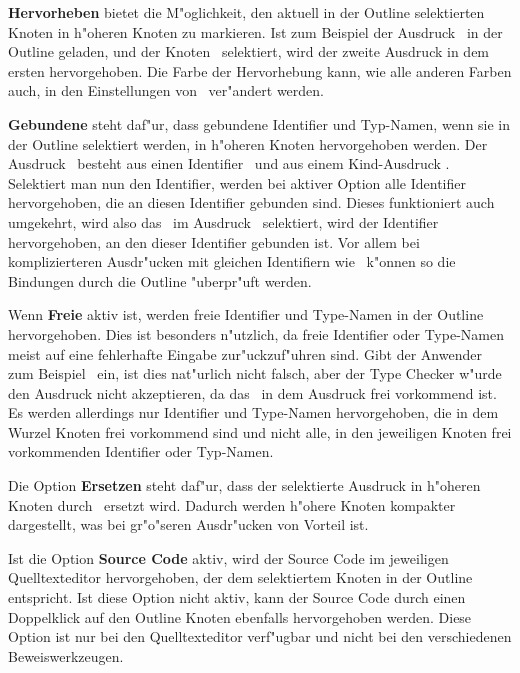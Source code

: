 {\bf Hervorheben} bietet die M"oglichkeit, den aktuell in der Outline
selektierten Knoten in h"oheren Knoten zu markieren. Ist zum Beispiel
der Ausdruck \grqq\ in der Outline geladen,
und der Knoten \grqq\ selektiert, wird der zweite Ausdruck
in dem ersten hervorgehoben. Die Farbe der Hervorhebung kann, wie alle
anderen Farben auch, in den Einstellungen von \TPML\ ver"andert werden.

{\bf Gebundene} steht daf"ur, dass gebundene Identifier und Typ-Namen,
wenn sie in der Outline selektiert werden, in h"oheren Knoten 
hervorgehoben werden. Der Ausdruck \grqq\ besteht
aus einen Identifier \grqq\ und aus einem Kind-Ausdruck
\grqq. Selektiert man nun den Identifier, werden bei
aktiver Option alle Identifier hervorgehoben, die an diesen Identifier
gebunden sind. Dieses funktioniert auch umgekehrt, wird also das
\grqq\ im Ausdruck \grqq\ selektiert, wird der
Identifier hervorgehoben, an den dieser Identifier gebunden ist. Vor allem
bei komplizierteren Ausdr"ucken mit gleichen Identifiern wie 
\grqq\ k"onnen so die Bindungen
durch die Outline "uberpr"uft werden.

Wenn {\bf Freie} aktiv ist, werden freie Identifier und Type-Namen in der
Outline hervorgehoben. Dies ist besonders n"utzlich, da freie Identifier
oder Type-Namen meist auf eine fehlerhafte Eingabe zur"uckzuf"uhren sind.
Gibt der Anwender zum Beispiel \grqq\ ein, ist 
dies nat"urlich nicht falsch, aber der Type Checker w"urde den Ausdruck
nicht akzeptieren, da das \grqq\ in dem Ausdruck frei 
vorkommend ist. Es werden allerdings nur Identifier und Type-Namen
hervorgehoben, die in dem Wurzel Knoten frei vorkommend sind und nicht
alle, in den jeweiligen Knoten frei vorkommenden Identifier oder Typ-Namen.

Die Option {\bf Ersetzen} steht daf"ur, dass der selektierte Ausdruck
in h"oheren Knoten durch \grqq\ ersetzt wird. Dadurch
werden h"ohere Knoten kompakter dargestellt, was bei gr"o"seren Ausdr"ucken
von Vorteil ist.

Ist die Option {\bf Source Code} aktiv, wird der Source Code im jeweiligen
Quelltexteditor hervorgehoben, der dem selektiertem Knoten in der Outline
entspricht. Ist diese Option nicht aktiv, kann der Source Code durch einen
Doppelklick auf den Outline Knoten ebenfalls hervorgehoben werden. Diese
Option ist nur bei den Quelltexteditor verf"ugbar und nicht bei den
verschiedenen Beweiswerkzeugen.

